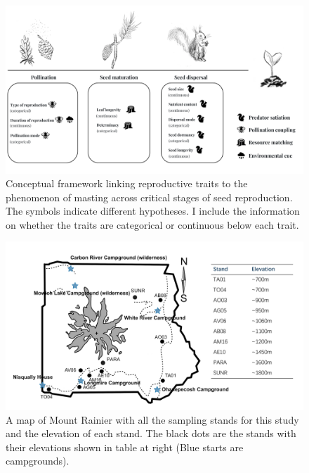 \documentclass[11pt,letter]{article}
\begin{document}
\begin{figure}[htb]
	\centering
	\includegraphics[width=1\linewidth]{conceptualChap1.png}
	\caption{Conceptual framework linking reproductive traits to the phenomenon of masting across critical stages of seed reproduction. The symbols indicate different hypotheses. I include the information on whether the traits are categorical or continuous below each trait.}
	\label{fig:conceptual1}
\end{figure}
\begin{figure}[htb]
	\centering
	\includegraphics[width=1\linewidth]{rainierMap.png}
	\caption{A map of Mount Rainier with all the sampling stands for this study and the elevation of each stand. The black dots are the stands with their elevations shown in table at right (Blue starts are campgrounds).}
	\label{fig:sites}
\end{figure}
\end{document}

